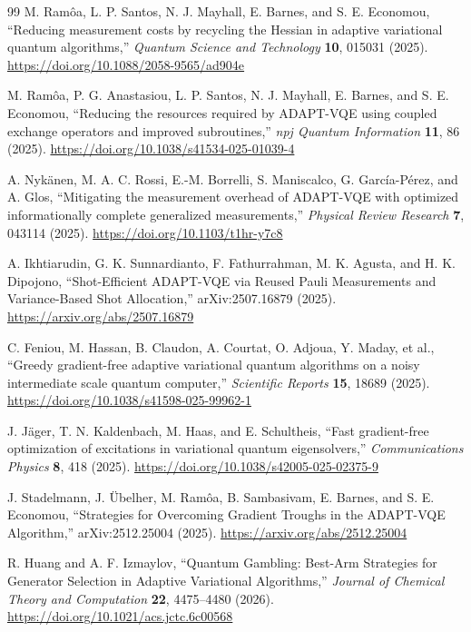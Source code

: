 \documentclass[11pt]{article}
\begin{document}
\begin{thebibliography}{99}
M. Ram\^oa, L. P. Santos, N. J. Mayhall, E. Barnes, and S. E. Economou,
``Reducing measurement costs by recycling the Hessian in adaptive variational quantum algorithms,''
\emph{Quantum Science and Technology} \textbf{10}, 015031 (2025).
\url{https://doi.org/10.1088/2058-9565/ad904e}

M. Ram\^oa, P. G. Anastasiou, L. P. Santos, N. J. Mayhall, E. Barnes, and S. E. Economou,
``Reducing the resources required by ADAPT-VQE using coupled exchange operators and improved subroutines,''
\emph{npj Quantum Information} \textbf{11}, 86 (2025).
\url{https://doi.org/10.1038/s41534-025-01039-4}

A. Nyk\"anen, M. A. C. Rossi, E.-M. Borrelli, S. Maniscalco, G. Garc\'ia-P\'erez, and A. Glos,
``Mitigating the measurement overhead of ADAPT-VQE with optimized informationally complete generalized measurements,''
\emph{Physical Review Research} \textbf{7}, 043114 (2025).
\url{https://doi.org/10.1103/t1hr-y7c8}

A. Ikhtiarudin, G. K. Sunnardianto, F. Fathurrahman, M. K. Agusta, and H. K. Dipojono,
``Shot-Efficient ADAPT-VQE via Reused Pauli Measurements and Variance-Based Shot Allocation,''
arXiv:2507.16879 (2025).
\url{https://arxiv.org/abs/2507.16879}

C. Feniou, M. Hassan, B. Claudon, A. Courtat, O. Adjoua, Y. Maday, et al.,
``Greedy gradient-free adaptive variational quantum algorithms on a noisy intermediate scale quantum computer,''
\emph{Scientific Reports} \textbf{15}, 18689 (2025).
\url{https://doi.org/10.1038/s41598-025-99962-1}

J. J\"ager, T. N. Kaldenbach, M. Haas, and E. Schultheis,
``Fast gradient-free optimization of excitations in variational quantum eigensolvers,''
\emph{Communications Physics} \textbf{8}, 418 (2025).
\url{https://doi.org/10.1038/s42005-025-02375-9}

J. Stadelmann, J. \"Ubelher, M. Ram\^oa, B. Sambasivam, E. Barnes, and S. E. Economou,
``Strategies for Overcoming Gradient Troughs in the ADAPT-VQE Algorithm,''
arXiv:2512.25004 (2025).
\url{https://arxiv.org/abs/2512.25004}

R. Huang and A. F. Izmaylov,
``Quantum Gambling: Best-Arm Strategies for Generator Selection in Adaptive Variational Algorithms,''
\emph{Journal of Chemical Theory and Computation} \textbf{22}, 4475--4480 (2026).
\url{https://doi.org/10.1021/acs.jctc.6c00568}


\end{thebibliography}
\end{document}
